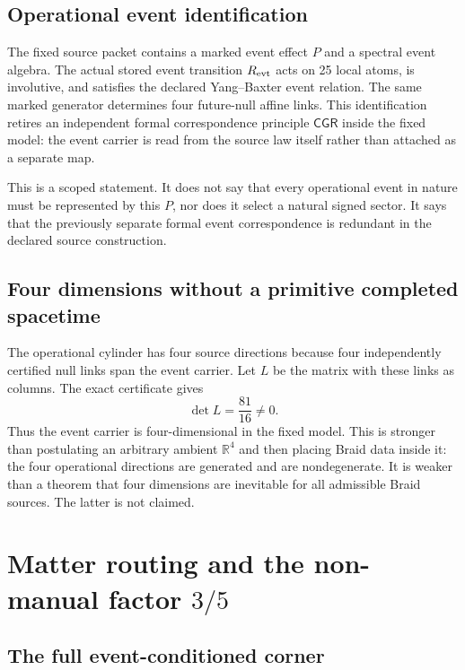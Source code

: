 \documentclass[11pt]{article}
\theoremstyle{definition}
\theoremstyle{remark}
\newcommand{\CGR}{\mathsf{CGR}}
\begin{document}
\subsection{Operational event identification}

The fixed source packet contains a marked event effect $P$ and a spectral event algebra. The actual stored event transition $R_{\rm evt}$ acts on 25 local atoms, is involutive, and satisfies the declared Yang--Baxter event relation. The same marked generator determines four future-null affine links. This identification retires an independent formal correspondence principle $\CGR$ inside the fixed model: the event carrier is read from the source law itself rather than attached as a separate map.

This is a scoped statement. It does not say that every operational event in nature must be represented by this $P$, nor does it select a natural signed sector. It says that the previously separate formal event correspondence is redundant in the declared source construction.

\subsection{Four dimensions without a primitive completed spacetime}

The operational cylinder has four source directions because four independently certified null links span the event carrier. Let $L$ be the matrix with these links as columns. The exact certificate gives
\begin{equation}
 \det L=\frac{81}{16}\neq0.
\end{equation}
Thus the event carrier is four-dimensional in the fixed model. This is stronger than postulating an arbitrary ambient $\mathbb R^4$ and then placing Braid data inside it: the four operational directions are generated and are nondegenerate. It is weaker than a theorem that four dimensions are inevitable for all admissible Braid sources. The latter is not claimed.

\section{Matter routing and the non-manual factor $3/5$}

\subsection{The full event-conditioned corner}
\end{document}
